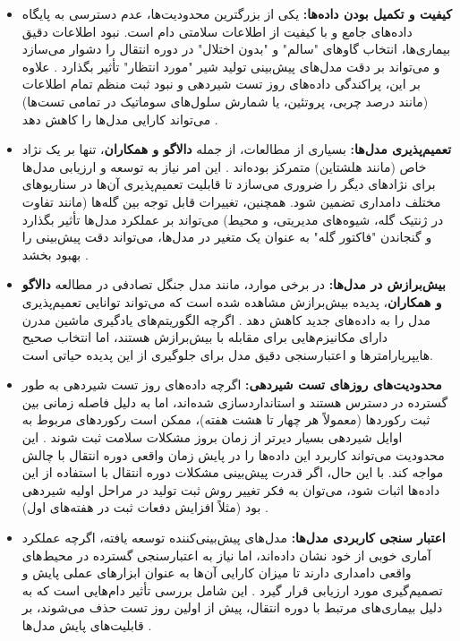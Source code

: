 \begin{itemize}
	\item \textbf{کیفیت و تکمیل بودن داده‌ها:} یکی از بزرگترین محدودیت‌ها، عدم دسترسی به پایگاه داده‌های جامع و با کیفیت از اطلاعات سلامتی دام است. نبود اطلاعات دقیق بیماری‌ها، انتخاب گاوهای "سالم" و "بدون اختلال" در دوره انتقال را دشوار می‌سازد و می‌تواند بر دقت مدل‌های پیش‌بینی تولید شیر "مورد انتظار" تأثیر بگذارد \cite{Salamone2022}. علاوه بر این، پراکندگی داده‌های روز تست شیردهی و نبود ثبت منظم تمام اطلاعات (مانند درصد چربی، پروتئین، یا شمارش سلول‌های سوماتیک در تمامی تست‌ها) می‌تواند کارایی مدل‌ها را کاهش دهد \cite{GuevaraEscobar2022}.
	
	\item \textbf{تعمیم‌پذیری مدل‌ها:} بسیاری از مطالعات، از جمله \textbf{دالاگو و همکاران}، تنها بر یک نژاد خاص (مانند هلشتاین) متمرکز بوده‌اند \cite{Dallago2019}. این امر نیاز به توسعه و ارزیابی مدل‌ها برای نژادهای دیگر را ضروری می‌سازد تا قابلیت تعمیم‌پذیری آن‌ها در سناریوهای مختلف دامداری تضمین شود. همچنین، تغییرات قابل توجه بین گله‌ها (مانند تفاوت در ژنتیک گله، شیوه‌های مدیریتی، و محیط) می‌تواند بر عملکرد مدل‌ها تأثیر بگذارد و گنجاندن "فاکتور گله" به عنوان یک متغیر در مدل‌ها، می‌تواند دقت پیش‌بینی را بهبود بخشد \cite{Dallago2019}.
	
	\item \textbf{بیش‌برازش در مدل‌ها:} در برخی موارد، مانند مدل جنگل تصادفی در مطالعه \textbf{دالاگو و همکاران}، پدیده بیش‌برازش مشاهده شده است که می‌تواند توانایی تعمیم‌پذیری مدل را به داده‌های جدید کاهش دهد \cite{Dallago2019}. اگرچه الگوریتم‌های یادگیری ماشین مدرن دارای مکانیزم‌هایی برای مقابله با بیش‌برازش هستند، اما انتخاب صحیح هایپرپارامترها و اعتبارسنجی دقیق مدل برای جلوگیری از این پدیده حیاتی است.
	
	\item \textbf{محدودیت‌های روزهای تست شیردهی:} اگرچه داده‌های روز تست شیردهی به طور گسترده در دسترس هستند و استانداردسازی شده‌اند، اما به دلیل فاصله زمانی بین ثبت رکوردها (معمولاً هر چهار تا هشت هفته)، ممکن است رکوردهای مربوط به اوایل شیردهی بسیار دیرتر از زمان بروز مشکلات سلامت ثبت شوند \cite{Salamone2022}. این محدودیت می‌تواند کاربرد این داده‌ها را در پایش زمان واقعی دوره انتقال با چالش مواجه کند. با این حال، اگر قدرت پیش‌بینی مشکلات دوره انتقال با استفاده از این داده‌ها اثبات شود، می‌توان به فکر تغییر روش ثبت تولید در مراحل اولیه شیردهی بود (مثلاً افزایش دفعات ثبت در هفته‌های اول) \cite{Salamone2022}.
	
	\item \textbf{اعتبار سنجی کاربردی مدل‌ها:} مدل‌های پیش‌بینی‌کننده توسعه یافته، اگرچه عملکرد آماری خوبی از خود نشان داده‌اند، اما نیاز به اعتبارسنجی گسترده در محیط‌های واقعی دامداری دارند تا میزان کارایی آن‌ها به عنوان ابزارهای عملی پایش و تصمیم‌گیری مورد ارزیابی قرار گیرد \cite{Salamone2022, Dallago2019}. این شامل بررسی تأثیر دام‌هایی است که به دلیل بیماری‌های مرتبط با دوره انتقال، پیش از اولین روز تست حذف می‌شوند، بر قابلیت‌های پایش مدل‌ها \cite{Salamone2022}.
\end{itemize}

